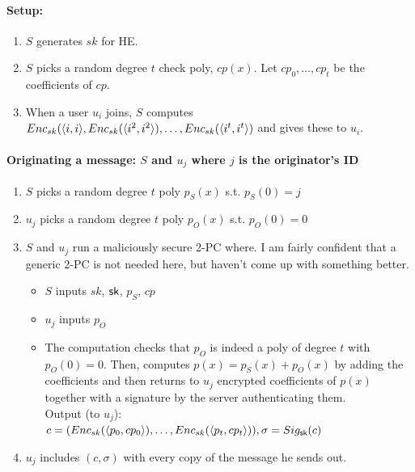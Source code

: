 \paragraph{Setup:}
\begin{enumerate}
\item $S$ generates $sk$ for HE.
\item $S$ picks a random degree $t$ check poly, $cp(x)$.  Let $cp_0,\ldots,cp_t$ be the coefficients of $cp$.
\item When a user $u_i$ joins, $S$ computes $Enc_{sk}(\langle i, i \rangle ,Enc_{sk}(\langle i^2, i^2 \rangle),\ldots,Enc_{sk}(\langle i^t, i^t \rangle)$ and gives these to $u_i$.
\end{enumerate}

\paragraph{Originating a message: $S$ and $u_j$ where $j$ is the originator's ID}
\begin{enumerate}
\item $S$ picks a random degree $t$ poly $p_S(x)$ s.t. $p_S(0)=j$
\item $u_j$ picks a random degree $t$ poly $p_O(x)$ s.t. $p_O(0)=0$
\item $S$ and $u_j$ run a maliciously secure 2-PC where.  I am fairly confident that a generic 2-PC is not needed here, but haven't come up with something better. 
\begin{itemize}
\item $S$ inputs $sk$, $\textsf{sk}$, $p_S$, $cp$
\item $u_j$ inputs $p_O$
\item The computation checks that $p_O$ is indeed a poly of degree $t$ with $p_O(0)=0$.  Then, computes $p(x)=p_S(x)+p_O(x)$ by adding the coefficients and then returns to $u_j$ encrypted coefficients of $p(x)$ together with a signature by the server authenticating them.\\
Output (to $u_j$):  \\$c = (Enc_{sk}(\langle p_0, cp_0 \rangle), \ldots, Enc_{sk}(\langle p_t, cp_t \rangle)), \sigma=Sig_{\textsf{sk}}(c)$ 
\end{itemize}
\item $u_j$ includes $(c,\sigma)$ with every copy of the message he sends out.
\end{enumerate}

